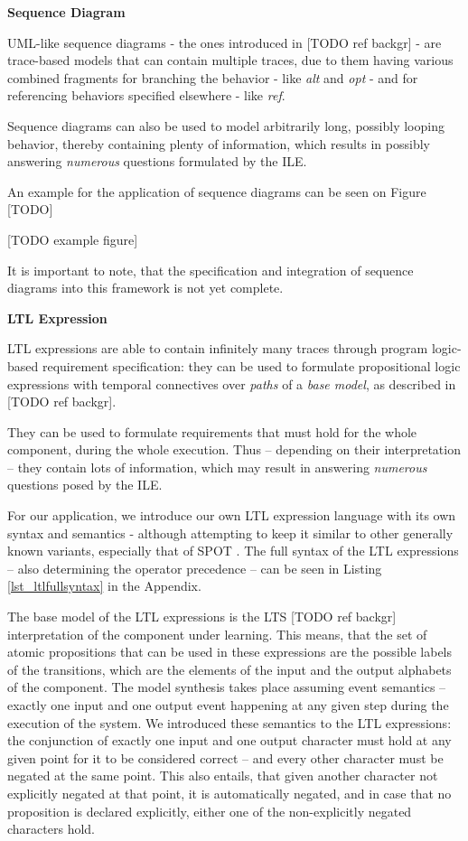 \textbf{Sequence Diagram}

UML-like sequence diagrams - the ones introduced in [TODO ref backgr] - are trace-based models that can contain multiple traces, due to them having various combined fragments for branching the behavior - like \textit{alt} and \textit{opt} - and for referencing behaviors specified elsewhere - like \textit{ref}.

Sequence diagrams can also be used to model arbitrarily long, possibly looping behavior, thereby containing plenty of information, which results in possibly answering \textit{numerous} questions formulated by the ILE.

An example for the application of sequence diagrams can be seen on Figure [TODO]

[TODO example figure]

It is important to note, that the specification and integration of sequence diagrams into this framework is not yet complete. 

\textbf{LTL Expression}

LTL expressions are able to contain infinitely many traces through program logic-based requirement specification: they can be used to formulate propositional logic expressions with temporal connectives over \textit{paths} of a \textit{base model}, as described in [TODO ref backgr]. 

They can be used to formulate requirements that must hold for the whole component, during the whole execution. Thus -- depending on their interpretation -- they contain lots of information, which may result in answering \textit{numerous} questions posed by the ILE.

For our application, we introduce our own LTL expression language with its own syntax and semantics - although attempting to keep it similar to other generally known variants, especially that of SPOT \cite{Spot}. The full syntax of the LTL expressions -- also determining the operator precedence -- can be seen in Listing \ref{lst_ltlfullsyntax} in the Appendix.

The base model of the LTL expressions is the LTS [TODO ref backgr] interpretation of the component under learning. This means, that the set of atomic propositions that can be used in these expressions are the possible labels of the transitions, which are the elements of the input and the output alphabets of the component. The model synthesis takes place assuming event semantics -- exactly one input and one output event happening at any given step during the execution of the system. We introduced these semantics to the LTL expressions: the conjunction of exactly one input and one output character must hold at any given point for it to be considered correct -- and every other character must be negated at the same point. This also entails, that given another character not explicitly negated at that point, it is automatically negated, and in case that no proposition is declared explicitly, either one of the non-explicitly negated characters hold. 

